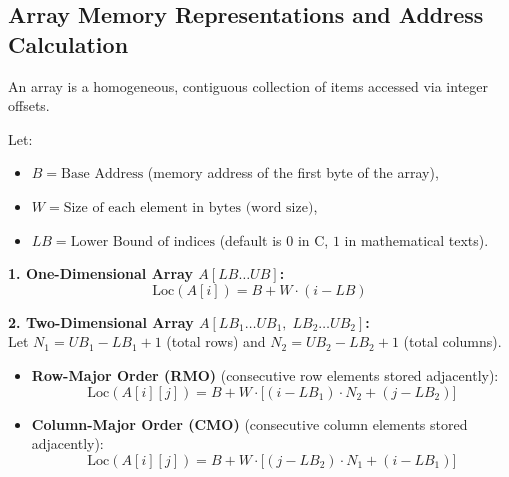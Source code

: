 \documentclass[12pt,a4paper]{article}
\begin{document}
\subsection{Array Memory Representations and Address Calculation}
An array is a homogeneous, contiguous collection of items accessed via integer offsets.
\par\vspace{4pt}\noindent
Let:
\begin{itemize}[leftmargin=*, nosep]
  \item $B = \text{Base Address}$ (memory address of the first byte of the array),
  \item $W = \text{Size of each element in bytes (word size)}$,
  \item $LB = \text{Lower Bound of indices}$ (default is $0$ in C, $1$ in mathematical texts).
\end{itemize}

\begin{tcolorbox}[formulabox, title={\textbf{Address Calculation Formulas for Multi-Dimensional Arrays}}]
\textbf{1. One-Dimensional Array $A[LB \dots UB]$:}
\begin{equation}
  \text{Loc}(A[i]) = B + W \cdot (i - LB)
\end{equation}

\textbf{2. Two-Dimensional Array $A[LB_1 \dots UB_1, \; LB_2 \dots UB_2]$:}\\
Let $N_1 = UB_1 - LB_1 + 1$ (total rows) and $N_2 = UB_2 - LB_2 + 1$ (total columns).
\begin{itemize}[leftmargin=*, itemsep=3pt]
  \item \textbf{Row-Major Order (RMO)} (consecutive row elements stored adjacently):
  \begin{equation}
    \text{Loc}(A[i][j]) = B + W \cdot \Big[ (i - LB_1) \cdot N_2 + (j - LB_2) \Big]
  \end{equation}
  \item \textbf{Column-Major Order (CMO)} (consecutive column elements stored adjacently):
  \begin{equation}
    \text{Loc}(A[i][j]) = B + W \cdot \Big[ (j - LB_2) \cdot N_1 + (i - LB_1) \Big]
  \end{equation}
\end{itemize}
\end{tcolorbox}
\end{document}
